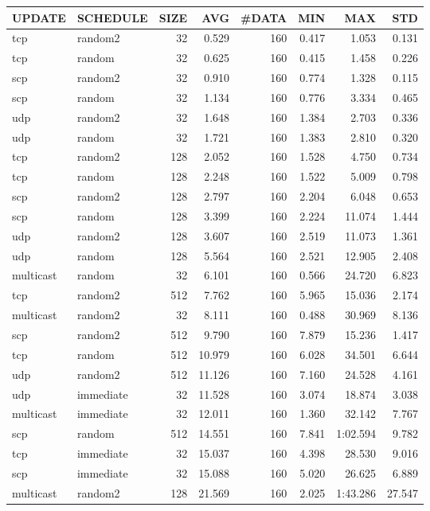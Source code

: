 \begin{tabular}{|l|l|r|r|r|r|r|r|}
\hline
UPDATE & SCHEDULE & SIZE & AVG & \#DATA & MIN & MAX & STD\\
\hline
tcp & random2 & 32 &  0.529 & 160 & 0.417 & 1.053 & 0.131\\
tcp & random & 32 &  0.625 & 160 & 0.415 & 1.458 & 0.226\\
scp & random2 & 32 &  0.910 & 160 & 0.774 & 1.328 & 0.115\\
scp & random & 32 &  1.134 & 160 & 0.776 & 3.334 & 0.465\\
udp & random2 & 32 &  1.648 & 160 & 1.384 & 2.703 & 0.336\\
udp & random & 32 &  1.721 & 160 & 1.383 & 2.810 & 0.320\\
tcp & random2 & 128 &  2.052 & 160 & 1.528 & 4.750 & 0.734\\
tcp & random & 128 &  2.248 & 160 & 1.522 & 5.009 & 0.798\\
scp & random2 & 128 &  2.797 & 160 & 2.204 & 6.048 & 0.653\\
scp & random & 128 &  3.399 & 160 & 2.224 & 11.074 & 1.444\\
udp & random2 & 128 &  3.607 & 160 & 2.519 & 11.073 & 1.361\\
udp & random & 128 &  5.564 & 160 & 2.521 & 12.905 & 2.408\\
multicast & random & 32 &  6.101 & 160 & 0.566 & 24.720 & 6.823\\
tcp & random2 & 512 &  7.762 & 160 & 5.965 & 15.036 & 2.174\\
multicast & random2 & 32 &  8.111 & 160 & 0.488 & 30.969 & 8.136\\
scp & random2 & 512 &  9.790 & 160 & 7.879 & 15.236 & 1.417\\
tcp & random & 512 &  10.979 & 160 & 6.028 & 34.501 & 6.644\\
udp & random2 & 512 &  11.126 & 160 & 7.160 & 24.528 & 4.161\\
udp & immediate & 32 &  11.528 & 160 & 3.074 & 18.874 & 3.038\\
multicast & immediate & 32 &  12.011 & 160 & 1.360 & 32.142 & 7.767\\
scp & random & 512 &  14.551 & 160 & 7.841 & 1:02.594 & 9.782\\
tcp & immediate & 32 &  15.037 & 160 & 4.398 & 28.530 & 9.016\\
scp & immediate & 32 &  15.088 & 160 & 5.020 & 26.625 & 6.889\\
multicast & random2 & 128 &  21.569 & 160 & 2.025 & 1:43.286 & 27.547\\

\end{tabular}
